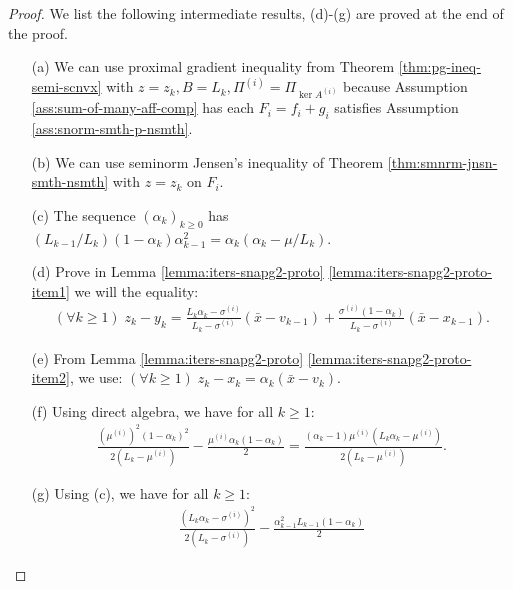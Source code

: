 \documentclass[12pt]{article}
\begin{document}
    \begin{proof}
        We list the following intermediate results, (d)-(g) are proved at the end of the proof. 
        \begin{itemize}
            \item[(a)] We can use proximal gradient inequality from Theorem \ref{thm:pg-ineq-semi-scnvx} with $z = z_k, B = L_k, \Pi^{(i)} = \Pi_{\ker A^{(i)}}$ because Assumption \ref{ass:sum-of-many-aff-comp} has each $F_i = f_i + g_i$ satisfies Assumption \ref{ass:snorm-smth-p-nsmth}. 
            \item[(b)] We can use seminorm Jensen's inequality of Theorem \ref{thm:smnrm-jnsn-smth-nsmth} with $z = z_k$ on $F_i$. 
            \item[(c)] The sequence $(\alpha_k)_{k \ge 0}$ has $(L_{k - 1}/L_k)(1 - \alpha_{k})\alpha_{k - 1}^2 = \alpha_{k}\left(\alpha_{k} - \mu/L_k\right)$. 
            \item[(d)] Prove in Lemma \ref{lemma:iters-snapg2-proto} \ref{lemma:iters-snapg2-proto-item1} we will the equality:
            \begin{align*}
                (\forall k \ge 1)\; 
                z_k - y_k 
                = 
                \frac{L_k\alpha_k - \sigma^{(i)}}{L_k - \sigma^{(i)}}(\bar x - v_{k - 1})
                + \frac{\sigma^{(i)}(1 - \alpha_k)}{L_k - \sigma^{(i)}}(\bar x - x_{k - 1}).
            \end{align*}
            \item [(e)] From Lemma \ref{lemma:iters-snapg2-proto} \ref{lemma:iters-snapg2-proto-item2}, we use: $(\forall k \ge 1)\; z_k - x_k = \alpha_k (\bar x - v_k)$. 
            \item [(f)] Using direct algebra, we have for all $k \ge 1$: 
            \begin{align*}
                \frac{\left(\mu^{(i)}\right)^2(1 - \alpha_k)^2}{2(L_k - \mu^{(i)})} 
                - \frac{\mu^{(i)}\alpha_k(1 - \alpha_k)}{2}
                = \frac{(\alpha_k - 1)\mu^{(i)}\left(L_k\alpha_k - \mu^{(i)}\right)}
                {2\left(L_k - \mu^{(i)}\right)}. 
            \end{align*}
            \item [(g)] Using (c), we have for all $k \ge 1$: 
            \begin{align*}
                \frac{\left(
                    L_k\alpha_k - \sigma^{(i)}
                \right)^2}{2(L_k - \sigma^{(i)})} 
                -
                \frac{\alpha_{k - 1}^2L_{k - 1}(1 - \alpha_k)}{2} 

\end{align*}
\end{itemize}
\end{proof}
\end{document}
